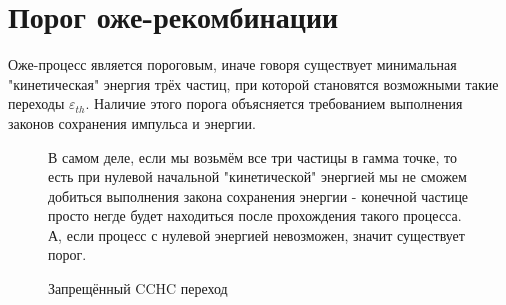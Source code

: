 \documentclass[../main.tex]{subfiles}
\begin{document}
    \section{Порог оже-рекомбинации}

        Оже-процесс является пороговым, иначе говоря существует минимальная "кинетическая"
    энергия трёх частиц, при которой становятся возможными такие переходы $\varepsilon_{th}$. Наличие этого 
    порога объясняется требованием выполнения законов сохранения импульса и энергии. 
    
    \begin{figure}[h!]
        \begin{minipage}[h]{0.66\linewidth}
        В самом деле,
        если мы возьмём все три частицы в гамма точке, то есть при нулевой
        начальной "кинетической" энергией мы не сможем добиться выполнения закона сохранения энергии - 
        конечной частице просто негде будет находиться после прохождения такого процесса.
        А, если процесс с нулевой энергией невозможен, значит существует порог.
        \end{minipage}
        \hfill
        \begin{minipage}[h]{0.33\linewidth}
            \begin{center}
            \end{center}
            \caption{Запрещённый CCHC переход}
        \end{minipage}
    \end{figure}
\end{document}
